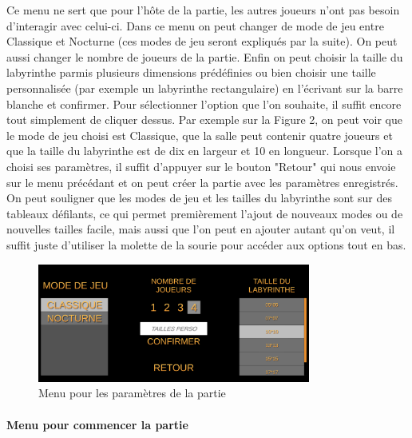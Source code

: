 \documentclass{article}
\begin{document}
Ce menu ne sert que pour l'hôte de la partie, les autres joueurs n'ont pas besoin d'interagir avec celui-ci. Dans ce menu on peut changer de mode de jeu entre Classique et Nocturne (ces modes de jeu seront expliqués par la suite). On peut aussi changer le nombre de joueurs de la partie. Enfin on peut choisir la taille du labyrinthe parmis plusieurs dimensions prédéfinies ou bien choisir une taille personnalisée (par exemple un labyrinthe rectangulaire) en l'écrivant sur la barre blanche et confirmer. Pour sélectionner l'option que l'on souhaite, il suffit encore tout simplement de cliquer dessus. Par exemple sur la Figure 2, on peut voir que le mode de jeu choisi est Classique, que la salle peut contenir quatre joueurs et que la taille du labyrinthe est de dix en largeur et 10 en longueur. Lorsque l'on a choisi ses paramètres, il suffit d'appuyer sur le bouton "Retour" qui nous envoie sur le menu précédant et on peut créer la partie avec les paramètres enregistrés. On peut souligner que les modes de jeu et les tailles du labyrinthe sont sur des tableaux défilants, ce qui permet premièrement l'ajout de nouveaux modes ou de nouvelles tailles facile, mais aussi que l'on peut en ajouter autant qu'on veut, il suffit juste d'utiliser la molette de la sourie pour accéder aux options tout en bas.



\begin{figure}[!ht]
    \centering
    \includegraphics[width=0.8\textwidth]{Menu2.png}
    \caption{Menu pour les paramètres de la partie}
    \label{Menu pour les paramètres de la partie}
\end{figure}


\paragraph{Menu pour commencer la partie}
\end{document}

